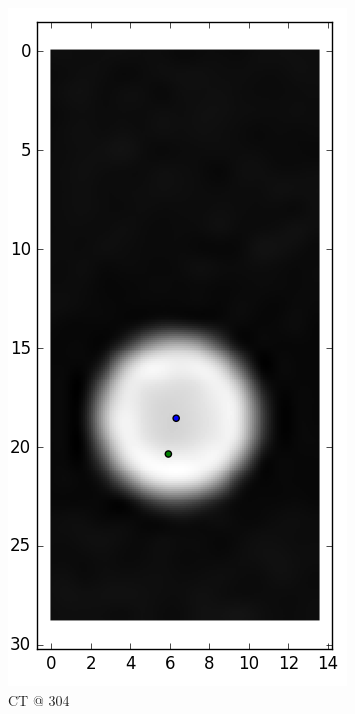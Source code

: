 \documentclass[parskip,bibtotoc,final,twoside=false,titlepage,a4paper,english,12pt,titlepage,a4paper]{scrbook}
\begin{document}
\begin{figure}[!tbp]
\begin{subfigure}[b]{0.32\textwidth}
    \includegraphics[scale=0.55]{python/centroid/CT_x100@304_centroids.png}
    \caption{CT @ 304}
    \label{fig:CT_x100_centroids@304}
  \end{subfigure}
  \begin{subfigure}[b]{0.32\textwidth}

\end{subfigure}
\end{figure}
\end{document}
